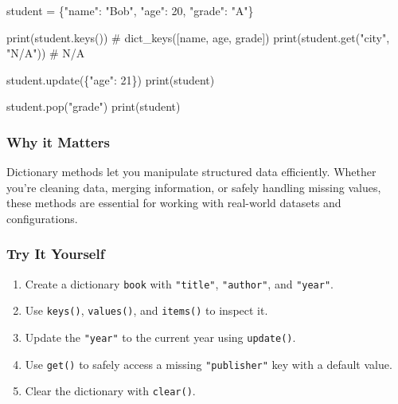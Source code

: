 \documentclass[
  letterpaper,
  DIV=11,
  numbers=noendperiod]{scrreprt}
\newenvironment{Shaded}{\begin{snugshade}}{\end{snugshade}}
\newcommand{\BuiltInTok}[1]{\textcolor[rgb]{0.00,0.23,0.31}{#1}}
\newcommand{\CommentTok}[1]{\textcolor[rgb]{0.37,0.37,0.37}{#1}}
\newcommand{\DecValTok}[1]{\textcolor[rgb]{0.68,0.00,0.00}{#1}}
\newcommand{\NormalTok}[1]{\textcolor[rgb]{0.00,0.23,0.31}{#1}}
\newcommand{\OperatorTok}[1]{\textcolor[rgb]{0.37,0.37,0.37}{#1}}
\newcommand{\StringTok}[1]{\textcolor[rgb]{0.13,0.47,0.30}{#1}}
\providecommand{\tightlist}{%
  \setlength{\itemsep}{0pt}\setlength{\parskip}{0pt}}
\begin{document}
\begin{Shaded}
\begin{Highlighting}[]
\NormalTok{student }\OperatorTok{=}\NormalTok{ \{}\StringTok{"name"}\NormalTok{: }\StringTok{"Bob"}\NormalTok{, }\StringTok{"age"}\NormalTok{: }\DecValTok{20}\NormalTok{, }\StringTok{"grade"}\NormalTok{: }\StringTok{"A"}\NormalTok{\}}

\BuiltInTok{print}\NormalTok{(student.keys())       }\CommentTok{\# dict\_keys([\textquotesingle{}name\textquotesingle{}, \textquotesingle{}age\textquotesingle{}, \textquotesingle{}grade\textquotesingle{}])}
\BuiltInTok{print}\NormalTok{(student.get(}\StringTok{"city"}\NormalTok{, }\StringTok{"N/A"}\NormalTok{))  }\CommentTok{\# N/A}

\NormalTok{student.update(\{}\StringTok{"age"}\NormalTok{: }\DecValTok{21}\NormalTok{\})}
\BuiltInTok{print}\NormalTok{(student)}

\NormalTok{student.pop(}\StringTok{"grade"}\NormalTok{)}
\BuiltInTok{print}\NormalTok{(student)}
\end{Highlighting}
\end{Shaded}

\subsubsection{Why it Matters}\label{why-it-matters-28}

Dictionary methods let you manipulate structured data efficiently.
Whether you're cleaning data, merging information, or safely handling
missing values, these methods are essential for working with real-world
datasets and configurations.

\subsubsection{Try It Yourself}\label{try-it-yourself-28}

\begin{enumerate}
\def\labelenumi{\arabic{enumi}.}
\tightlist
\item
  Create a dictionary \texttt{book} with \texttt{"title"},
  \texttt{"author"}, and \texttt{"year"}.
\item
  Use \texttt{keys()}, \texttt{values()}, and \texttt{items()} to
  inspect it.
\item
  Update the \texttt{"year"} to the current year using
  \texttt{update()}.
\item
  Use \texttt{get()} to safely access a missing \texttt{"publisher"} key
  with a default value.
\item
  Clear the dictionary with \texttt{clear()}.
\end{enumerate}
\end{document}
